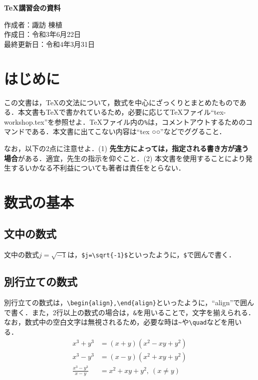 \documentclass[11pt,a4paper]{jsarticle}
\begin{document}
\begin{center}
  {\Large\bfseries \TeX 講習会の資料} %
\end{center}
\begin{flushright}
  作成者：諏訪 棟植\\
  作成日：令和3年6月22日\\
  最終更新日：令和4年3月31日 %
\end{flushright}
%
%
\section{はじめに}

この文書は，\TeX の文法について，数式を中心にざっくりとまとめたものである．本文書も\TeX で書かれているため，必要に応じて\TeX ファイル``tex-workshop.tex''を参照せよ．TeXファイル内の\verb|%|は，コメントアウトするためのコマンドである．本文書に出てこない内容は``tex ○○''などでググること．

なお，以下の2点に注意せよ．(1) \textbf{先生方によっては，指定される書き方が違う場合}がある．適宜，先生の指示を仰ぐこと．(2) 本文書を使用することにより発生するいかなる不利益についても著者は責任をとらない．

\section{数式の基本}

\subsection{文中の数式}

文中の数式$j=\sqrt{-1}$は，\verb|$j=\sqrt{-1}$|といったように，\verb|$|で囲んで書く．

\subsection{別行立ての数式}

別行立ての数式は，\verb|\begin{align},\end{align}|といったように，``align''で囲んで書く．また，2行以上の数式の場合は，\verb|&|を用いることで，文字を揃えられる．なお，数式中の空白文字は無視されるため，必要な時は\verb|~|や\verb|\quad|などを用いる．
\begin{align}
  x^3+y^3             & =(x+y)\left(x^2-xy+y^2\right) \label{eq:factorization-1} \\
  x^3-y^3             & =(x-y)\left(x^2+xy+y^2\right) \label{eq:factorization-2} \\
  \frac{x^3-y^3}{x-y} & =x^2+xy+y^2,~(x\neq y) \label{eq:factorization-3}
\end{align}
\end{document}
